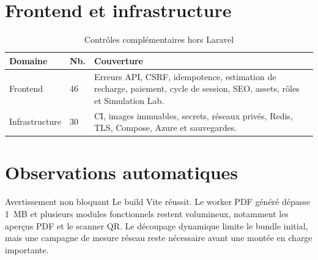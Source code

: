 \section{Frontend et infrastructure}

\begin{table}[H]
\centering
\caption{Contrôles complémentaires hors Laravel}
\begin{tabularx}{\textwidth}{|L{4.5cm}|C{1.5cm}|Y|}
\hline
{}\textbf{Domaine} & \textbf{Nb.} & \textbf{Couverture} \\ \hline
Frontend & 46 & Erreurs API, CSRF, idempotence, estimation de recharge, paiement, cycle de session, SEO, assets, rôles et Simulation Lab. \\ \hline
Infrastructure & 30 & CI, images immuables, secrets, réseaux privés, Redis, TLS, Compose, Azure et sauvegardes. \\ \hline
\end{tabularx}
\end{table}

\section{Observations automatiques}

\begin{testbox}{Avertissement non bloquant}
Le build Vite réussit. Le worker PDF généré dépasse 1~MB et plusieurs modules
fonctionnels restent volumineux, notamment les aperçus PDF et le scanner QR.
Le découpage dynamique limite le bundle initial, mais une campagne de mesure
réseau reste nécessaire avant une montée en charge importante.
\end{testbox}
